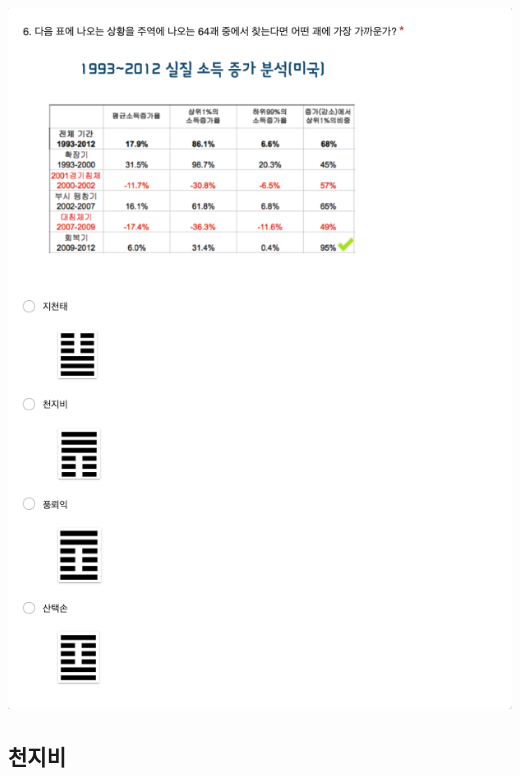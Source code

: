 \documentclass[
]{book}
\begin{document}
\includegraphics[width=0.75\linewidth]{./pics/Quiz230503_Q6}

\subsection{천지비}\label{uxcc9cuxc9c0uxbe44-2}
\end{document}
